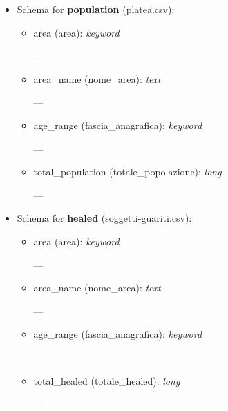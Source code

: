 \documentclass[12pt, a4paper]{article}
\begin{document}
\begin{itemize}
\begin{itemize}
\begin{footnotesize}
                    ---
                \end{footnotesize}
        \end{itemize}
    \item Schema for \textbf{population} (platea.csv):
        \begin{itemize}
            \item area (area): \emph{keyword} \\
                \begin{footnotesize}
                    ---
                \end{footnotesize}
            \item area\_name (nome\_area): \emph{text} \\
                \begin{footnotesize}
                    ---
                \end{footnotesize}
            \item age\_range (fascia\_anagrafica): \emph{keyword} \\
                \begin{footnotesize}
                    ---
                \end{footnotesize}
            \item total\_population (totale\_popolazione): \emph{long} \\
                \begin{footnotesize}
                    ---
                \end{footnotesize}
        \end{itemize}
    \item Schema for \textbf{healed} (soggetti-guariti.csv):
    \begin{itemize}
        \item area (area): \emph{keyword} \\
            \begin{footnotesize}
                ---
            \end{footnotesize}
        \item area\_name (nome\_area): \emph{text} \\
            \begin{footnotesize}
                ---
            \end{footnotesize}
        \item age\_range (fascia\_anagrafica): \emph{keyword} \\
            \begin{footnotesize}
                ---
            \end{footnotesize}
        \item total\_healed (totale\_healed): \emph{long} \\
            \begin{footnotesize}
                ---
            \end{footnotesize}
    \end{itemize}
\end{itemize}
\end{document}
